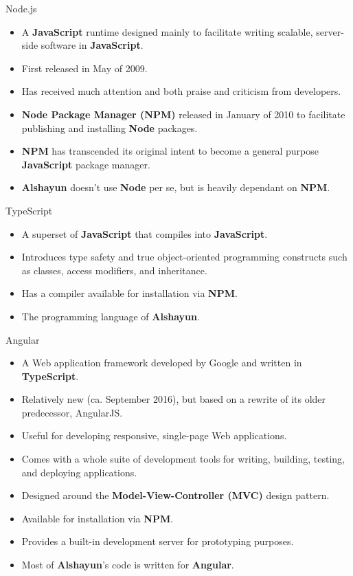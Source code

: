 \documentclass{beamer}
\begin{document}
\begin{frame}{Node.js}
    \begin{itemize}
        \item A \textbf{JavaScript} runtime designed mainly to facilitate
            writing scalable, server-side software in \textbf{JavaScript}.
        \item First released in May of 2009.
        \item Has received much attention and both praise and criticism from
            developers.
        \item \textbf{Node Package Manager (NPM)} released in January of 2010 to
            facilitate publishing and installing \textbf{Node} packages.
        \item \textbf{NPM} has transcended its original intent to become a
            general purpose \textbf{JavaScript} package manager.
        \item \textbf{Alshayun} doesn't use \textbf{Node} per se, but is heavily
            dependant on \textbf{NPM}.
    \end{itemize}
\end{frame}

\begin{frame}{TypeScript}
    \begin{itemize}
        \item A superset of \textbf{JavaScript} that compiles into
            \textbf{JavaScript}.
        \item Introduces type safety and true object-oriented programming
            constructs such as classes, access modifiers, and inheritance.
        \item Has a compiler available for installation via \textbf{NPM}.
        \item The programming language of \textbf{Alshayun}.
    \end{itemize}
\end{frame}

\begin{frame}{Angular}
    \begin{itemize}
        \item A Web application framework developed by Google and written in
            \textbf{TypeScript}.
        \item Relatively new (ca. September 2016), but based on a rewrite of its
            older predecessor, AngularJS.
        \item Useful for developing responsive, single-page Web applications.
        \item Comes with a whole suite of development tools for writing,
            building, testing, and deploying applications.
        \item Designed around the \textbf{Model-View-Controller (MVC)} design
            pattern.
        \item Available for installation via \textbf{NPM}.
        \item Provides a built-in development server for prototyping purposes.
        \item Most of \textbf{Alshayun}'s code is written for \textbf{Angular}.
    \end{itemize}
\end{frame}
\end{document}
